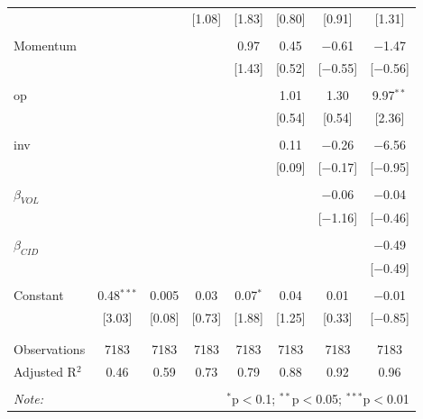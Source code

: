 \documentclass[12pt]{article}
\begin{document}
\begin{table}[!htbp]
\begin{tabular}{@{\extracolsep{5pt}}lccccccc}
  &  &  & [1.08] & [1.83] & [0.80] & [0.91] & [1.31] \\ 
  & & & & & & & \\ 
 Momentum &  &  &  & 0.97 & 0.45 & $-$0.61 & $-$1.47 \\ 
  &  &  &  & [1.43] & [0.52] & [$-$0.55] & [$-$0.56] \\ 
  & & & & & & & \\ 
 op &  &  &  &  & 1.01 & 1.30 & 9.97$^{**}$ \\ 
  &  &  &  &  & [0.54] & [0.54] & [2.36] \\ 
  & & & & & & & \\ 
 inv &  &  &  &  & 0.11 & $-$0.26 & $-$6.56 \\ 
  &  &  &  &  & [0.09] & [$-$0.17] & [$-$0.95] \\ 
  & & & & & & & \\ 
 $\beta_{VOL}$ &  &  &  &  &  & $-$0.06 & $-$0.04 \\ 
  &  &  &  &  &  & [$-$1.16] & [$-$0.46] \\ 
  & & & & & & & \\ 
 $\beta_{CID}$ &  &  &  &  &  &  & $-$0.49 \\ 
  &  &  &  &  &  &  & [$-$0.49] \\ 
  & & & & & & & \\ 
 Constant & 0.48$^{***}$ & 0.005 & 0.03 & 0.07$^{*}$ & 0.04 & 0.01 & $-$0.01 \\ 
  & [3.03] & [0.08] & [0.73] & [1.88] & [1.25] & [0.33] & [$-$0.85] \\ 
  & & & & & & & \\ 
\hline \\[-1.8ex] 
Observations & 7183 & 7183 & 7183 & 7183 & 7183 & 7183 & 7183 \\ 
Adjusted R$^{2}$ & 0.46 & 0.59 & 0.73 & 0.79 & 0.88 & 0.92 & 0.96 \\ 
\hline 
\hline \\[-1.8ex] 
\textit{Note:}  & \multicolumn{7}{r}{$^{*}$p$<$0.1; $^{**}$p$<$0.05; $^{***}$p$<$0.01} \\ 
\end{tabular} 
\end{table}
\end{document}
